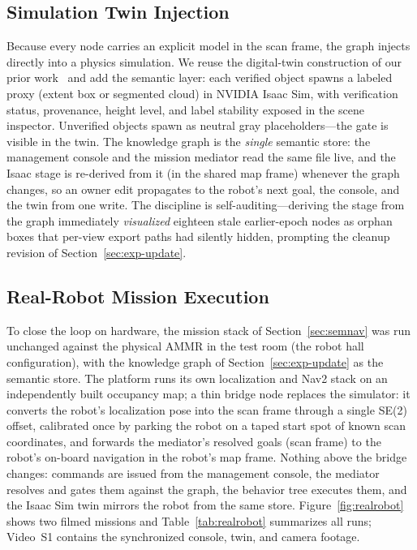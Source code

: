 \documentclass[electronics,article,accept,pdftex,moreauthors]{Definitions/mdpi}
\begin{document}
\subsection{Simulation Twin Injection}
\label{sec:twin}
Because every node carries an explicit model in the scan frame, the graph
injects directly into a physics simulation. We reuse the digital-twin
construction of our prior work~\cite{raaicon2026} and add the semantic layer:
each verified object spawns a labeled proxy (extent box or segmented cloud)
in NVIDIA Isaac Sim, with verification status, provenance, height level,
and label stability exposed in the scene inspector. Unverified objects
spawn as neutral gray placeholders---the gate is visible in the twin.
The knowledge graph is the \emph{single} semantic store: the management
console and the mission mediator read the same file live, and the Isaac
stage is re-derived from it (in the shared map frame) whenever the graph
changes, so an owner edit propagates to the robot's next goal, the
console, and the twin from one write. The discipline is
self-auditing---deriving the stage from the graph immediately
\emph{visualized} eighteen stale earlier-epoch nodes as orphan boxes that
per-view export paths had silently hidden, prompting the cleanup revision
of Section~\ref{sec:exp-update}.

\subsection{Real-Robot Mission Execution}
\label{sec:realrobot}
To close the loop on hardware, the mission stack of Section~\ref{sec:semnav}
was run unchanged against the physical AMMR in the test room (the robot
hall configuration), with the knowledge graph of
Section~\ref{sec:exp-update} as the semantic store. The platform runs its own
localization and Nav2 stack on an independently built occupancy map; a
thin bridge node replaces the simulator: it converts the robot's
localization pose into the scan frame through a single SE(2) offset,
calibrated once by parking the robot on a taped start spot of known scan
coordinates, and forwards the mediator's resolved goals (scan frame) to
the robot's on-board navigation in the robot's map frame. Nothing above
the bridge changes: commands are issued from the management console, the
mediator resolves and gates them against the graph, the behavior tree
executes them, and the Isaac Sim twin mirrors the robot from the same
store. Figure~\ref{fig:realrobot} shows two filmed missions and
Table~\ref{tab:realrobot} summarizes all runs; Video~S1 contains the
synchronized console, twin, and camera footage.
\end{document}
